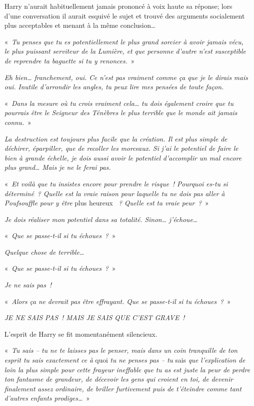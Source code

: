 Harry n'aurait habituellement jamais prononcé à voix haute sa réponse;
lors d'une conversation il aurait esquivé le sujet et trouvé des arguments socialement plus acceptables et menant à la même conclusion…

«~\emph{Tu penses que tu es potentiellement le plus grand sorcier à avoir jamais vécu, le plus puissant serviteur de la Lumière, et que personne d'autre n'est susceptible de reprendre ta baguette si tu y renonces.}~»

\emph{Eh bien… franchement, oui.
Ce n'est pas vraiment comme ça que je le dirais mais oui.
Inutile d'arrondir les angles, tu peux lire mes pensées de toute façon.}

«~\emph{Dans la mesure où tu crois vraiment cela… tu dois également croire que tu pourrais être le Seigneur des Ténèbres le plus terrible que le monde ait jamais connu.}~»

\emph{La destruction est toujours plus facile que la création.
Il est plus simple de déchirer, éparpiller, que de recoller les morceaux.
Si j'ai le potentiel de faire le bien à grande échelle, je dois aussi avoir le potentiel d'accomplir un mal encore plus grand…
Mais je ne le ferai pas.}

«~\emph{Et voilà que tu insistes encore pour prendre le risque~!
Pourquoi es-tu si déterminé~?
Quelle est la vraie raison pour laquelle tu ne dois pas aller à Poufsouffle pour y être} plus heureux \emph{~? Quelle est ta vraie peur~?}~»

\emph{Je dois réaliser mon potentiel dans sa totalité. Sinon… j'échoue…}

«~\emph{Que se passe-t-il si tu échoues~?}~»

\emph{Quelque chose de terrible…}

«~\emph{Que se passe-t-il si tu échoues~?}~»

\emph{Je ne sais pas~!}

«~\emph{Alors ça ne devrait pas être effrayant. Que se passe-t-il si tu échoues~?}~»

\emph{JE NE SAIS PAS~! MAIS JE SAIS QUE C'EST GRAVE~!}

L'esprit de Harry se fit momentanément silencieux.

«~\emph{Tu sais -- tu ne te laisses pas le penser, mais dans un coin tranquille de ton esprit tu sais exactement ce à} quoi \emph{tu ne penses pas -- tu} sais \emph{que l'explication de loin la plus simple pour cette frayeur ineffable que tu as est juste la peur de perdre ton fantasme de grandeur, de décevoir les gens qui croient en toi, de devenir finalement assez ordinaire, de briller furtivement puis de t'éteindre comme tant d'autres enfants prodiges…}~»

